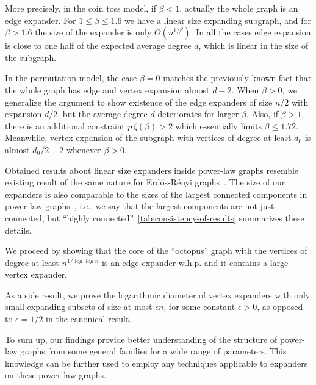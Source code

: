 More precisely, in the coin toss model, if $\beta<1$, actually the whole graph is an edge expander.
For $1\leq\beta\leq 1.6$ we have a linear size expanding subgraph,
and for $\beta>1.6$ the size of the expander is only $\Theta(n^{1/\beta})$.
In all the cases edge expansion is close to one half of the expected average degree $d$,
which is linear in the size of the subgraph.

In the permutation model, the case $\beta=0$ matches the previously known fact
that the whole graph has edge and vertex expansion almost $d-2$.
When $\beta>0$, we generalize the argument to show existence
of the edge expanders of size $n/2$ with expansion $d/2$,
but the average degree $d$ deteriorates for larger $\beta$.
Also, if $\beta>1$, there is an additional constraint $p\,\zeta(\beta)>2$
which essentially limits $\beta\leq 1.72$.
Meanwhile, vertex expansion of the subgraph with vertices of degree
at least $d_0$ is almost $d_0/2-2$ whenever $\beta>0$.

Obtained results about linear size expanders inside power-law graphs
resemble existing result of the same nature for Erd\H{o}s-R\'enyi graphs~\cite{kri17}.
The size of our expanders is also comparable to the sizes of
the largest connected components in power-law graphs~\cite{acl01}, i.e.,
we say that the largest components are not just connected, but ``highly connected''.
\autoref{tab:consistency-of-results} summarizes these details.

We proceed by showing that the core of the ``octopus'' graph with the vertices
of degree at least $n^{1/\log\log n}$ is an edge expander w.h.p.
and it contains a large vertex expander.

As a side result, we prove the logarithmic diameter of vertex expanders
with only small expanding subsets of size at most $\epsilon n$, for some
constant $\epsilon>0$, as opposed to $\epsilon=1/2$ in the canonical result.

To sum up, our findings provide better understanding of the structure
of power-law graphs from some general families for a wide range of parameters.
This knowledge can be further used to employ any techniques
applicable to expanders on these power-law graphs.

